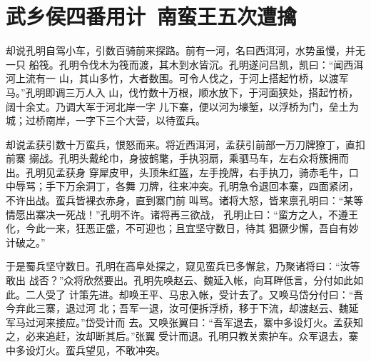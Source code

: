 \chapter{武乡侯四番用计~南蛮王五次遭擒}

却说孔明自驾小车，引数百骑前来探路。前有一河，名曰西洱河，水势虽慢，并无一只
船筏。孔明令伐木为筏而渡，其木到水皆沉。孔明遂问吕凯，凯曰：“闻西洱河上流有一
山，其山多竹，大者数围。可令人伐之，于河上搭起竹桥，以渡军马。”孔明即调三万人入
山，伐竹数十万根，顺水放下，于河面狭处，搭起竹桥，阔十余丈。乃调大军于河北岸一字
儿下寨，便以河为壕堑，以浮桥为门，垒土为城；过桥南岸，一字下三个大营，以待蛮兵。

却说孟获引数十万蛮兵，恨怒而来。将近西洱河，孟获引前部一万刀牌獠丁，直扣前寨
搦战。孔明头戴纶巾，身披鹤氅，手执羽扇，乘驷马车，左右众将簇拥而出。孔明见孟获身
穿犀皮甲，头顶朱红盔，左手挽牌，右手执刀，骑赤毛牛，口中辱骂；手下万余洞丁，各舞
刀牌，往来冲突。孔明急令退回本寨，四面紧闭，不许出战。蛮兵皆裸衣赤身，直到寨门前
叫骂。诸将大怒，皆来禀孔明曰：“某等情愿出寨决一死战！”孔明不许。诸将再三欲战，
孔明止曰：“蛮方之人，不遵王化，今此一来，狂恶正盛，不可迎也；且宜坚守数日，待其
猖獗少懈，吾自有妙计破之。”

于是蜀兵坚守数日。孔明在高阜处探之，窥见蛮兵已多懈怠，乃聚诸将曰：“汝等敢出
战否？”众将欣然要出。孔明先唤赵云、魏延入帐，向耳畔低言，分付如此如此。二人受了
计策先进。却唤王平、马忠入帐，受计去了。又唤马岱分付曰：“吾今弃此三寨，退过河
北；吾军一退，汝可便拆浮桥，移于下流，却渡赵云、魏延军马过河来接应。”岱受计而
去。又唤张翼曰：“吾军退去，寨中多设灯火。孟获知之，必来追赶，汝却断其后。”张翼
受计而退。孔明只教关索护车。众军退去，寨中多设灯火。蛮兵望见，不敢冲突。


